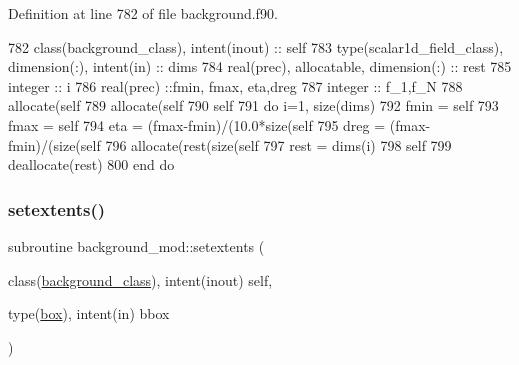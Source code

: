 Definition at line 782 of file background.\+f90.


\begin{DoxyCode}
782     \textcolor{keywordtype}{class}(background\_class), \textcolor{keywordtype}{intent(inout)} :: self
783     \textcolor{keywordtype}{type}(scalar1d\_field\_class), \textcolor{keywordtype}{dimension(:)}, \textcolor{keywordtype}{intent(in)} :: dims
784     \textcolor{keywordtype}{real(prec)}, \textcolor{keywordtype}{allocatable}, \textcolor{keywordtype}{dimension(:)} :: rest
785     \textcolor{keywordtype}{integer} :: i
786     \textcolor{keywordtype}{real(prec)} ::fmin, fmax, eta,dreg
787     \textcolor{keywordtype}{integer} :: f\_1,f\_N
788     \textcolor{keyword}{allocate}(self%
789     \textcolor{keyword}{allocate}(self%
790     self%
791     \textcolor{keywordflow}{do} i=1, \textcolor{keyword}{size}(dims)
792         fmin = self%
793         fmax = self%
794         eta = (fmax-fmin)/(10.0*\textcolor{keyword}{size}(self%
795         dreg = (fmax-fmin)/(\textcolor{keyword}{size}(self%
796         \textcolor{keyword}{allocate}(rest(\textcolor{keyword}{size}(self%
797         rest = dims(i)%
798         self%
799         \textcolor{keyword}{deallocate}(rest)
800 \textcolor{keywordflow}{    end do}
\end{DoxyCode}
\mbox{\label{namespacebackground__mod_ae8871564866fdd657a25f6a5a2256c33}} 
\subsubsection{\texorpdfstring{setextents()}{setextents()}}
{\footnotesize\ttfamily subroutine background\+\_\+mod\+::setextents (\begin{DoxyParamCaption}\item[{class(\mbox{\hyperlink{structbackground__mod_1_1background__class}{background\+\_\+class}}), intent(inout)}]{self,  }\item[{type(\mbox{\hyperlink{structgeometry__mod_1_1box}{box}}), intent(in)}]{bbox }\end{DoxyParamCaption})\hspace{0.3cm}{\ttfamily [private]}}



